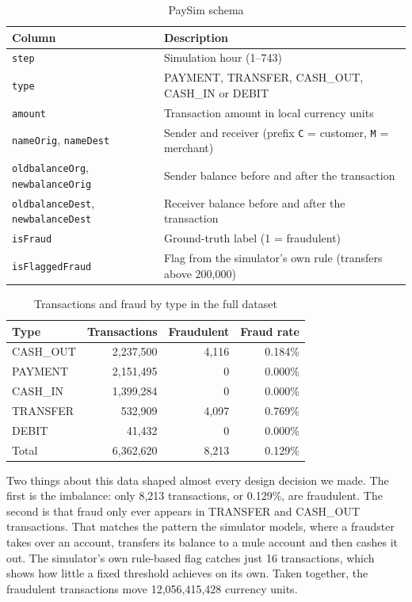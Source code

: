 \documentclass[11pt,a4paper]{article}
\newcommand{\code}[1]{\texttt{#1}}
\begin{document}
\begin{table}[H]
\centering
\caption{PaySim schema}
\label{tab:schema}
\begin{tabularx}{\linewidth}{lL}
\toprule
Column & Description \\
\midrule
\code{step} & Simulation hour (1--743) \\
\code{type} & PAYMENT, TRANSFER, CASH\_OUT, CASH\_IN or DEBIT \\
\code{amount} & Transaction amount in local currency units \\
\code{nameOrig}, \code{nameDest} & Sender and receiver (prefix \code{C} = customer, \code{M} = merchant) \\
\code{oldbalanceOrg}, \code{newbalanceOrig} & Sender balance before and after the transaction \\
\code{oldbalanceDest}, \code{newbalanceDest} & Receiver balance before and after the transaction \\
\code{isFraud} & Ground-truth label (1 = fraudulent) \\
\code{isFlaggedFraud} & Flag from the simulator's own rule (transfers above 200,000) \\
\bottomrule
\end{tabularx}
\end{table}

\begin{table}[H]
\centering
\caption{Transactions and fraud by type in the full dataset}
\label{tab:types}
\begin{tabular}{lrrr}
\toprule
Type & Transactions & Fraudulent & Fraud rate \\
\midrule
CASH\_OUT & 2,237,500 & 4,116 & 0.184\% \\
PAYMENT   & 2,151,495 & 0     & 0.000\% \\
CASH\_IN  & 1,399,284 & 0     & 0.000\% \\
TRANSFER  &   532,909 & 4,097 & 0.769\% \\
DEBIT     &    41,432 & 0     & 0.000\% \\
\midrule
Total & 6,362,620 & 8,213 & 0.129\% \\
\bottomrule
\end{tabular}
\end{table}

Two things about this data shaped almost every design decision we made. The
first is the imbalance: only 8,213 transactions, or 0.129\%, are fraudulent. The
second is that fraud only ever appears in TRANSFER and CASH\_OUT transactions.
That matches the pattern the simulator models, where a fraudster takes over an
account, transfers its balance to a mule account and then cashes it out. The
simulator's own rule-based flag catches just 16 transactions, which shows how
little a fixed threshold achieves on its own. Taken together, the fraudulent
transactions move 12,056,415,428 currency units.
\end{document}
